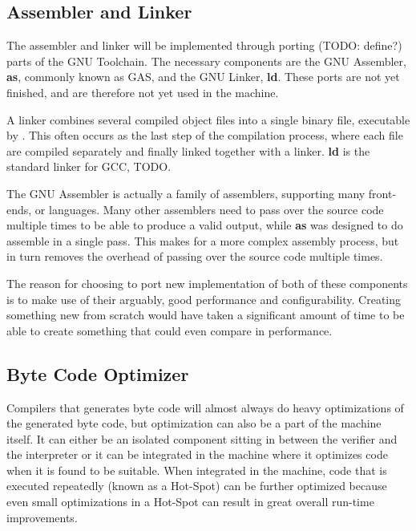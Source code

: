 \subsection{Assembler and Linker}

The assembler and linker will be implemented through porting (TODO: define?)
parts of the GNU Toolchain. The necessary components are the GNU
Assembler\cite{gnu:as}, {\bf as}, commonly known as GAS, and the GNU Linker,
{\bf ld}\cite{gnu:ld}. These ports are not yet finished, and are therefore not
yet used in the machine.

A linker combines several compiled object files into a single binary file,
executable by \thename{}. This often occurs as the last step of the compilation
process, where each file are compiled separately and finally linked together
with a linker. {\bf ld} is the standard linker for GCC, TODO.

The GNU Assembler is actually a family of assemblers, supporting many
front-ends, or languages. Many other assemblers need to pass over the source
code multiple times to be able to produce a valid output, while {\bf as} was
designed to do assemble in a single pass. This makes for a more complex assembly
process, but in turn removes the overhead of passing over the source code
multiple times.

The reason for choosing to port new implementation of both of these components
is to make use of their arguably, good performance and
configurability\cite{NEEDED}. Creating something new from scratch would have
taken a significant amount of time to be able to create something that could
even compare in performance.


\subsection{Byte Code Optimizer}

Compilers that generates byte code will almost always do heavy optimizations of
the generated byte code, but optimization can also be a part of the machine
itself. It can either be an isolated component sitting in between the verifier
and the interpreter or it can be integrated in the machine where it optimizes
code when it is found to be suitable. When integrated in the machine, code that
is executed repeatedly (known as a Hot-Spot) can be further optimized because
even small optimizations in a Hot-Spot can result in great overall run-time
improvements.

